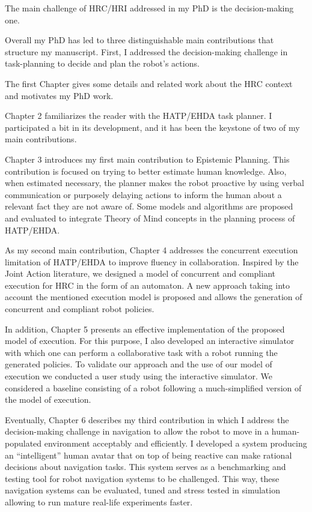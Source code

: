 
The main challenge of HRC/HRI addressed in my PhD is the decision-making one.

Overall my PhD has led to three distinguishable main contributions that structure my manuscript. 
First, I addressed the decision-making challenge in task-planning to decide and plan the robot's actions. 

The first Chapter gives some details and related work about the HRC context and motivates my PhD work.

Chapter 2 familiarizes the reader with the HATP/EHDA task planner. I participated a bit in its development, and it has been the keystone of two of my main contributions.

Chapter 3 introduces my first main contribution to Epistemic Planning. This contribution is focused on trying to better estimate human knowledge. Also, when estimated necessary, the planner makes the robot proactive by using verbal communication or purposely delaying actions to inform the human about a relevant fact they are not aware of. Some models and algorithms are proposed and evaluated to integrate Theory of Mind concepts in the planning process of HATP/EHDA.

As my second main contribution, Chapter 4 addresses the concurrent execution limitation of HATP/EHDA to improve fluency in collaboration. Inspired by the Joint Action literature, we designed a model of concurrent and compliant execution for HRC in the form of an automaton. A new approach taking into account the mentioned execution model is proposed and allows the generation of concurrent and compliant robot policies. 

In addition, Chapter 5 presents an effective implementation of the proposed model of execution. For this purpose, I also developed an interactive simulator with which one can perform a collaborative task with a robot running the generated policies. To validate our approach and the use of our model of execution we conducted a user study using the interactive simulator. We considered a baseline consisting of a robot following a much-simplified version of the model of execution.

Eventually, Chapter 6 describes my third contribution in which I address the decision-making challenge in navigation to allow the robot to move in a human-populated environment acceptably and efficiently. I developed a system producing an ``intelligent'' human avatar that on top of being reactive can make rational decisions about navigation tasks. This system serves as a benchmarking and testing tool for robot navigation systems to be challenged. This way, these navigation systems can be evaluated, tuned and stress tested in simulation allowing to run mature real-life experiments faster.  




